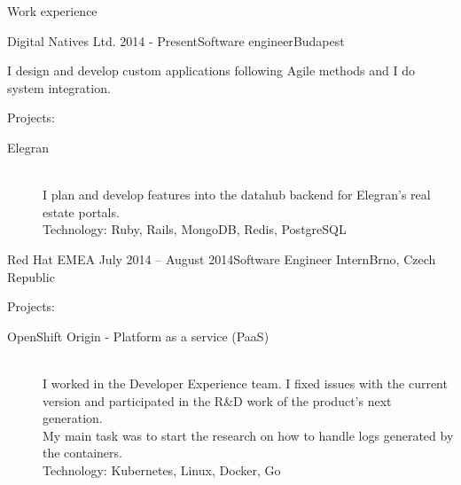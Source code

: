 \documentclass{resume} %
\begin{document}
\begin{rSection}{Work experience}

\begin{rSubsection}{Digital Natives Ltd.}
{2014 - Present}{Software engineer}{Budapest}
\item I design and develop custom applications following Agile methods and I do system integration.
\item Projects:
	\begin{description}
		\item[Elegran] \hfill \\
		I plan and develop features into the datahub backend for Elegran’s real estate portals. \\
		Technology: Ruby, Rails, MongoDB, Redis, PostgreSQL
	\end{description}
\end{rSubsection}

\begin{rSubsection}{Red Hat EMEA}
{July 2014 – August 2014}{Software Engineer Intern}{Brno, Czech Republic}
\item Projects:
	\begin{description}
		\item[OpenShift Origin - Platform as a service (PaaS)] \hfill \\
		I worked in the Developer Experience team. I fixed issues with the current version
		and participated in the R\&D work of the product's next generation.\\
		My main task was to start the research on how to handle logs generated by the containers. \\
		Technology: Kubernetes, Linux, Docker, Go
	\end{description}
\end{rSubsection}


\end{rSection}
\end{document}
